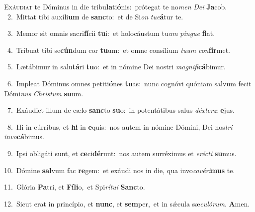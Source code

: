 \lettrine{\initial\textcolor{\initialcolor}{E}}{xáudiat} te Dóminus in die tribu\-\textbf{la}\-ti\-\textbf{ó}\-nis:~\star prótegat te no\textit{men} \textit{De}\-\textit{i} \textbf{Ja}\-cob.\\
{\numbfont\textcolor{\numbcolor}{~2.}}~Mittat tibi auxíli\textbf{um} de \textbf{sanc}\-to:~\star et de Si\textit{on} \textit{tu}\-\textit{e}\textbf{á}tur te.\par
{\numbfont\textcolor{\numbcolor}{~3.}}~Memor sit omnis sacri\-\textbf{fí}\-cii \textbf{tu}\-i:~\star et holocáustum tu\textit{um} \textit{pin}\-\textit{gue} \textbf{fi}\-at.\par
{\numbfont\textcolor{\numbcolor}{~4.}}~Tríbuat tibi se\-\textbf{cún}\-dum cor \textbf{tu}\-um:~\star et omne consílium \textit{tu}\-\textit{um} \textit{con}\-\textbf{fír}met.\par
{\numbfont\textcolor{\numbcolor}{~5.}}~Lætábimur in salu\-\textbf{tá}\-ri \textbf{tu}\-o:~\star et in nómine Dei nostri \textit{ma}\-\textit{gni}\textit{fi}\textbf{cá}bimur.\par
{\numbfont\textcolor{\numbcolor}{~6.}}~Impleat Dóminus omnes petiti\-\textbf{ó}\-nes \textbf{tu}\-as:~\star nunc cognóvi quóniam salvum fecit Dómi\textit{nus} \textit{Chris}\-\textit{tum} \textbf{su}\-um.\par
{\numbfont\textcolor{\numbcolor}{~7.}}~Exáudiet illum de cælo \textbf{sanc}\-to \textbf{su}\-o:~\star in potentátibus salus \textit{déx}\-\textit{te}\textit{ræ} \textbf{e}\-jus.\par
{\numbfont\textcolor{\numbcolor}{~8.}}~Hi in cúrribus, et \textbf{hi} in \textbf{e}\-quis:~\star nos autem in nómine Dómini, Dei nos\textit{tri} \textit{in}\-\textit{vo}\textbf{cá}bimus.\par
{\numbfont\textcolor{\numbcolor}{~9.}}~Ipsi obligáti sunt, et \textbf{ce}\-ci\-\textbf{dé}\-runt:~\star nos autem surréximus et \textit{e}\-\textit{réc}\textit{ti} \textbf{su}\-mus.\par
{\numbfont\textcolor{\numbcolor}{10.}}~Dómine \textbf{sal}\-vum fac \textbf{re}\-gem:~\star et exáudi nos in die, qua invo\-\textit{ca}\-\textit{vé}\textit{ri}\textbf{mus} te.\par
{\numbfont\textcolor{\numbcolor}{11.}}~Glória \textbf{Pa}\-tri, et \textbf{Fí}\-\textbf{li}o,~\star et Spi\-\textit{rí}\-\textit{tu}\textit{i} \textbf{Sanc}\-to.\par
{\numbfont\textcolor{\numbcolor}{12.}}~Sicut erat in princípio, et \textbf{nunc}\-, et \textbf{sem}\-per,~\star et in sǽcula sæ\-\textit{cu}\-\textit{ló}\textit{rum}. \textbf{A}\-men.\par
